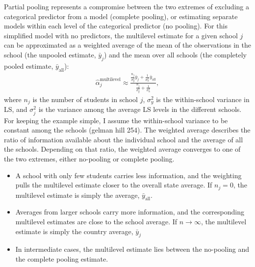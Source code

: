 \documentclass[a4, 12pt]{article}
\begin{document}
Partial pooling represents a compromise between the two extremes of excluding a categorical predictor from a model (complete pooling), or estimating separate models within each level of the categorical predictor (no pooling). For this simplified model with no predictors, the multilevel estimate for a given school \(j\) can be approximated as a weighted average of the mean of the observations in the school (the unpooled estimate, \(\bar{y}_j\)) and the mean over all schools (the completely pooled estimate, \(\bar{y}_{\mathrm {all}}\)):
\begin{align}\label{eq:weighted_average}
\hat{\alpha}_j^{\mathrm {multilevel}} \approx \frac {\frac{n_j}{\sigma_y^2}\bar y_j + \frac {1}{\sigma_{\alpha}^2}\bar y_{\mathrm {all}}}{\frac {n_j}{\sigma_y^2} + \frac {1}{\sigma_{\alpha}^2}},
\end{align}
where \(n_j\) is the number of students in school \(j\), \(\sigma^2_y\) is the within-school variance in LS, and \(\sigma^2_j\) is the variance among the average LS levels in the different schools. For keeping the example simple, I assume the within-school variance to be constant among the schools (gelman hill 254).
The weighted average describes the ratio of information available about the individual school and the average of all the schools. Depending on that ratio, the weighted average converges to one of the two extremes, either no-pooling or complete pooling.

\begin{itemize}
\item A school with only few students carries less information, and the weighting pulls the multilevel estimate closer to the overall state average. If $n_j=0$, the multilevel estimate is simply the average, $\bar y_{\mathrm {all}}$.
\item Averages from larger schools carry more information, and the corresponding multilevel estimates are close to the school average. If $n \rightarrow \infty$, the multilevel estimate is simply the country average, $\bar y_j$
\item In intermediate cases, the multilevel estimate lies between the no-pooling and the complete pooling estimate.
\end{itemize}
\end{document}
